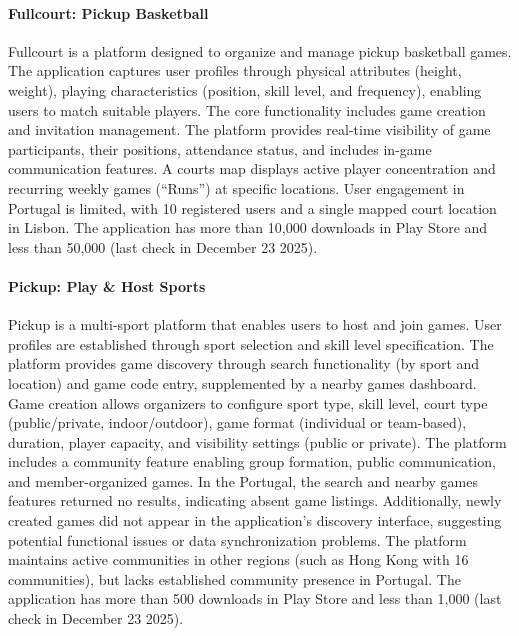 \paragraph{\textbf{Fullcourt: Pickup Basketball}}

Fullcourt is a platform designed to organize and manage pickup basketball games. The application captures user profiles through physical attributes (height, weight), playing characteristics (position, skill level, and frequency), enabling users to match suitable players. The core functionality includes game creation and invitation management. The platform provides real-time visibility of game participants, their positions, attendance status, and includes in-game communication features. A courts map displays active player concentration and recurring weekly games (``Runs'') at specific locations. User engagement in Portugal is limited, with 10 registered users and a single mapped court location in Lisbon. The application has more than 10,000 downloads in Play Store and less than 50,000 (last check in December 23 2025).

\paragraph{\textbf{Pickup: Play \& Host Sports}} 

Pickup is a multi-sport platform that enables users to host and join games. User profiles are established through sport selection and skill level specification. The platform provides game discovery through search functionality (by sport and location) and game code entry, supplemented by a nearby games dashboard. Game creation allows organizers to configure sport type, skill level, court type (public/private, indoor/outdoor), game format (individual or team-based), duration, player capacity, and visibility settings (public or private). The platform includes a community feature enabling group formation, public communication, and member-organized games. In the Portugal, the search and nearby games features returned no results, indicating absent game listings. Additionally, newly created games did not appear in the application's discovery interface, suggesting potential functional issues or data synchronization problems. The platform maintains active communities in other regions (such as Hong Kong with 16 communities), but lacks established community presence in Portugal. The application has more than 500 downloads in Play Store and less than 1,000 (last check in December 23 2025).

